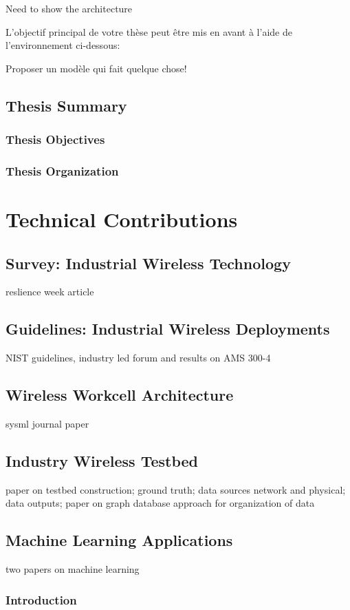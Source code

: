\documentclass[english]{spimubphdthesis}
\begin{document}
Need to show the architecture

L'objectif principal de votre thèse peut être mis en avant à l'aide de l'environnement ci-dessous:

\begin{emphbox}
	Proposer un modèle qui fait quelque chose!
\end{emphbox}

\chapter{Thesis Summary}

\section{Thesis Objectives}

\section{Thesis Organization}


\part{Technical Contributions}
\chapter{Survey: Industrial Wireless Technology}
reslience week article
\chapter{Guidelines: Industrial Wireless Deployments}
NIST guidelines, industry led forum and results on AMS 300-4
\chapter{Wireless Workcell Architecture}
sysml journal paper
\chapter{Industry Wireless Testbed}
paper on testbed construction; ground truth; data sources network and physical; data outputs; paper on graph database approach for organization of data
\chapter{Machine Learning Applications}
two papers on machine learning
\section{Introduction}
\end{document}
